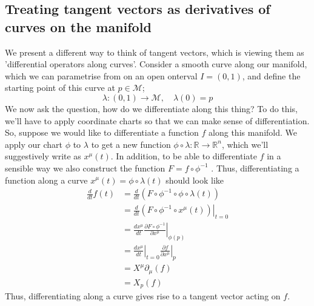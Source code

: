 \documentclass[11pt, a4paper]{article}   	%
\theoremstyle{slplain}
\begin{document}
\subsection{Treating tangent vectors as derivatives of curves on the manifold}
We present a different way to think of tangent vectors, which is viewing them as 'differential operators along curves'. Consider a smooth curve along our manifold, which we can parametrise from on an open onterval $I = (0 , 1)$, and define the starting point of this curve at $p \in \mathcal { M} $; 
\[ 
\lambda: ( 0, 1) \rightarrow \mathcal{ M}, \quad \lambda( 0 ) = p 
\]  
We now ask the question, how do we differentiate along this thing? To do this, we'll have to apply coordinate charts so that we can make sense of differentiation. So, suppose we would like to differentiate a function $f$ along this manifold. We apply our chart $\phi$ to $\lambda$ to get a new function $ \phi \circ \lambda : \mathbb{R} \rightarrow \mathbb{R}^n$, which we'll suggestively write as $x^\mu ( t) $. In addition, to be able to differentiate $f$ in a sensible way we also construct the function $F = f \circ \phi^ { -1} $ . Thus, differentiating a function along a curve $x^\mu ( t) = \phi \circ \lambda ( t) $ should look like 
\begin{align*} 
\frac{ d}{ dt} f(t) &= \frac{ d}{ dt} \left( F \circ \phi^{ -1} \circ \phi \circ \lambda (t) \right) \\
& = \left. \frac{d}{ dt} \left( F \circ \phi^{ -1} \circ x^\mu ( t) \right) \right\vert_{ t = 0} \\
&= \frac{ dx^\mu}{ dt} \left. \frac{ \partial F \circ \phi^{ -1} }{ \partial x^\mu } \right\vert_{ \phi( p ) } \\
&= \left. \frac{dx^\mu}{dt} \right\vert_{t =0} \left. \frac{ \partial f}{ \partial x^\mu } \right\vert_{ p } \\
&= X^\mu \partial_\mu (f) \\	
&= X_p (f)
\end{align*} 
Thus, differentiating along a curve gives rise to a tangent vector acting on $f$. 
\end{document}
